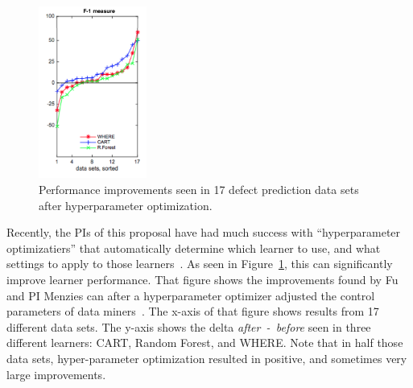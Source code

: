 \begin{figure}
    \includegraphics[width=1.4in]{figs/f1.png}  \caption{Performance improvements seen in 17 defect prediction data sets after   hyperparameter optimization.}\label{fig:tuned}
\end{figure}Recently, the PIs of this proposal have had much success  with   ``hyperparameter optimizatiers'' that automatically determine which learner to use, and what settings to apply to those learners~\cite{fu2016tuning,chen2017riot,nair2017flash,agrawal17,fu2017revisiting,nair2017faster,mathew2017shorter,nair2017faster,chen2017beyond,nair2016accidental,fu2016tuning,agrawal2018wrong,agrawal17}.
As seen in  Figure~\ref{fig:tuned}, this can   significantly improve learner performance. That figure shows the  improvements found by Fu and PI Menzies
can after a hyperparameter optimizer adjusted the control
 parameters of data miners~\cite{fu2016tuning}. The x-axis of that figure shows results from 17 different data sets. The y-axis shows the delta 
\mbox{{\em after - before}} seen in three different
learners: CART, Random Forest, and WHERE.
Note that in half those data sets, hyper-parameter optimization
resulted in positive, and sometimes very large improvements.


